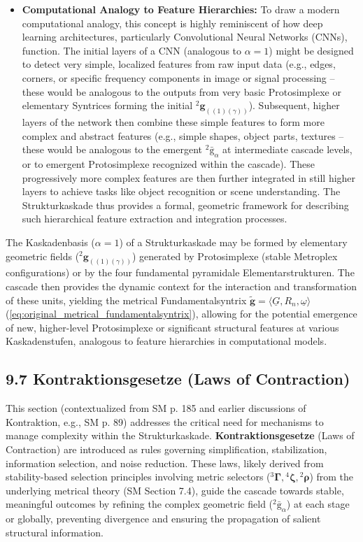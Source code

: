 \documentclass[12pt]{article}
\newcommand{\kompositionsfeld}{{}^2\bar{\mathrm{g}}}
\newcommand{\partialstruktur}[1]{{}^2\mathbf{g}_{(#1)}}
\newcommand{\fundamentalkondensor}{{}^3\bm{\Gamma}}
\newcommand{\kaskadenstufe}{\alpha}
\newcommand{\strukturkompressor}{{}^4\bm{\zeta}}
\begin{document}
\begin{itemize}
    \item \textbf{Computational Analogy to Feature Hierarchies:}
    To draw a modern computational analogy, this concept is highly reminiscent of how deep learning architectures, particularly Convolutional Neural Networks (CNNs), function. The initial layers of a CNN (analogous to \( \kaskadenstufe=1 \)) might be designed to detect very simple, localized features from raw input data (e.g., edges, corners, or specific frequency components in image or signal processing – these would be analogous to the outputs from very basic Protosimplexe or elementary Syntrices forming the initial \( \partialstruktur{(1)(\gamma)} \)). Subsequent, higher layers of the network then combine these simple features to form more complex and abstract features (e.g., simple shapes, object parts, textures – these would be analogous to the emergent \( \kompositionsfeld_\alpha \) at intermediate cascade levels, or to emergent Protosimplexe recognized within the cascade). These progressively more complex features are then further integrated in still higher layers to achieve tasks like object recognition or scene understanding. The Strukturkaskade thus provides a formal, geometric framework for describing such hierarchical feature extraction and integration processes.
\end{itemize}

The Kaskadenbasis (\(\kaskadenstufe=1\)) of a Strukturkaskade may be formed by elementary geometric fields (\(\partialstruktur{(1)(\gamma)}\)) generated by Protosimplexe (stable Metroplex configurations) or by the four fundamental pyramidale Elementarstrukturen. The cascade then provides the dynamic context for the interaction and transformation of these units, yielding the metrical Fundamentalsyntrix $\tilde{\mathbf{g}} = \langle \underline{G}, R_n, \underline{\omega} \rangle$ (\eqref{eq:original_metrical_fundamentalsyntrix}), allowing for the potential emergence of new, higher-level Protosimplexe or significant structural features at various Kaskadenstufen, analogous to feature hierarchies in computational models.

\subsection{9.7 Kontraktionsgesetze (Laws of Contraction)}
\label{sec:kontraktionsgesetze}

This section (contextualized from SM p. 185 and earlier discussions of Kontraktion, e.g., SM p. 89) addresses the critical need for mechanisms to manage complexity within the Strukturkaskade. \textbf{Kontraktionsgesetze} (Laws of Contraction) are introduced as rules governing simplification, stabilization, information selection, and noise reduction. These laws, likely derived from stability-based selection principles involving metric selectors (\(\fundamentalkondensor, \strukturkompressor, {}^2\bm{\rho}\)) from the underlying metrical theory (SM Section 7.4), guide the cascade towards stable, meaningful outcomes by refining the complex geometric field (\(\kompositionsfeld_\alpha\)) at each stage or globally, preventing divergence and ensuring the propagation of salient structural information.
\end{document}
